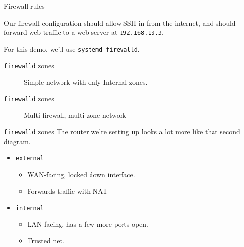 \documentclass[bigger,aspectratio=169]{beamer}
\begin{document}
\begin{frame}{Firewall rules}

  Our firewall configuration should allow SSH in from the internet, and should
  forward web traffic to a web server at \texttt{192.168.10.3}.

  For this demo, we'll use \texttt{systemd-firewalld}.
\end{frame}

\begin{frame}{\texttt{firewalld} zones}
  \begin{figure}
    
    \caption*{Simple network with only Internal zones.}
  \end{figure}
\end{frame}

\begin{frame}{\texttt{firewalld} zones}
  \begin{figure}
    
    \caption*{Multi-firewall, multi-zone network}
  \end{figure}
\end{frame}

\begin{frame}{\texttt{firewalld} zones}
  The router we're setting up looks a lot more like that second diagram.

  \begin{itemize}
  \item \texttt{external}
    \begin{itemize}
    \item WAN-facing, locked down interface.
    \item Forwards traffic with NAT
    \end{itemize}
  \item \texttt{internal}
    \begin{itemize}
    \item LAN-facing, has a few more ports open.
    \item Trusted net.
    \end{itemize}
  \end{itemize}
\end{frame}
\end{document}
